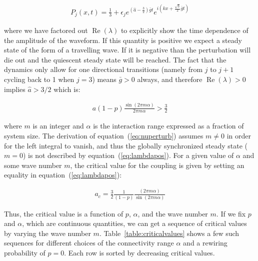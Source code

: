 \begin{align}
    P_j(x,t) = \frac{1}{3} + \epsilon_j e^{\left( \hat{a} - \frac{3}{2} \right)\bar{g}t} e^{i\left(kx + \frac{\sqrt{3}}{2}\bar{g}t\right)}
\end{align}

\noindent where we have factored out $\operatorname{Re}(\lambda)$ to explicitly show the time dependence of the amplitude of the
waveform. If this quantity is positive we expect a steady state of the form of a travelling wave. If it is negative than the
perturbation will die out and the quiescent steady state will be reached. The fact that the dynamics only allow for one directional
transitions (namely from $j$ to $j+1$ cycling back to 1 when $j=3$) means $\bar{g}>0$ always, and therefore
$\operatorname{Re}(\lambda)>0$ implies $\hat{a} > 3/2$ which is:

\begin{align}
    a(1-p)\frac{\sin(2\pi m\alpha)}{2\pi m\alpha} > \frac{3}{2}
    \label{eq:lambdapos}
\end{align}

\noindent where $m$ is an integer and $\alpha$ is the interaction range expressed as a fraction of system size. The derivation of
equation~(\ref{eq:nuperturb}) assumes $m\neq 0$ in order for the left integral to vanish, and thus the globally synchronized steady
state ($m=0$) is not described by equation~(\ref{eq:lambdapos}). For a given value of $\alpha$ and some wave number $m$, the critical
value for the coupling is given by setting an equality in equation~(\ref{eq:lambdapos}):

\begin{align}
    a_c = \frac{3}{2}\frac{1}{(1-p)}\frac{(2\pi m\alpha)}{\sin(2\pi m\alpha)}
\end{align}

Thus, the critical value is a function of $p$, $\alpha$, and the wave number $m$. If we fix $p$ and $\alpha$, which are continuous
quantities, we can get a sequence of critical values by varying the wave number $m$. Table~\ref{table:criticalvalues} shows a few such
sequences for different choices of the connectivity range $\alpha$ and a rewiring probability of $p=0$. Each row is sorted by
decreasing critical values.

\newcommand{\cc}{\cellcolor}

